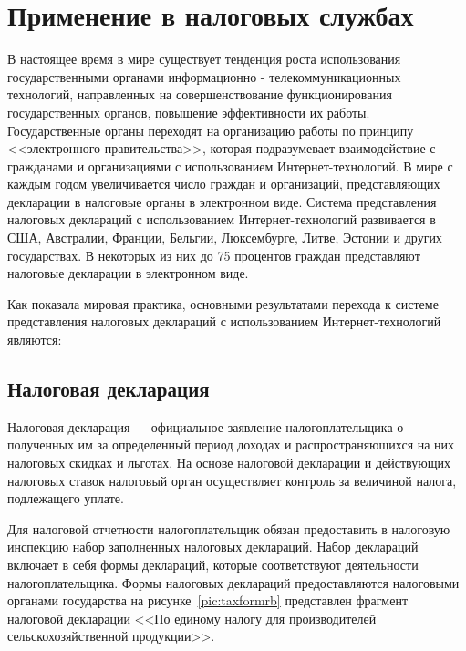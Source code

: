 \documentclass[14pt,a4paper]{reportmod}
\begin{document}
\section{Применение в налоговых службах}
В настоящее время в мире существует тенденция роста использования государственными органами информационно - телекоммуникационных технологий, направленных на совершенствование функционирования государственных органов, повышение эффективности их работы. Государственные органы переходят на организацию работы по принципу <<электронного правительства>>, которая подразумевает взаимодействие с гражданами и организациями с использованием Интернет-технологий. В мире с каждым годом увеличивается число граждан и организаций, представляющих декларации в налоговые органы в электронном виде. Система представления налоговых деклараций с использованием Интернет-технологий развивается в США, Австралии, Франции, Бельгии, Люксембурге, Литве, Эстонии и других государствах. В некоторых из них до 75 процентов граждан представляют налоговые декларации в электронном виде.

Как показала мировая практика, основными результатами перехода к системе представления налоговых деклараций с использованием Интернет-технологий являются:
\begin{gostitemize}
\end{gostitemize}

\subsection{Налоговая декларация}
Налоговая декларация — официальное заявление налогоплательщика о полученных им за определенный период доходах и распространяющихся на них налоговых скидках и льготах. На основе налоговой декларации и действующих налоговых ставок налоговый орган осуществляет контроль за величиной налога, подлежащего уплате\cite{refwikitaxreturn}.

Для налоговой отчетности налогоплательщик обязан предоставить в налоговую инспекцию набор заполненных налоговых деклараций. Набор деклараций включает в себя формы деклараций, которые соответствуют деятельности налогоплательщика. Формы налоговых деклараций предоставляются налоговыми органами государства на рисунке~\ref{pic:taxformrb} представлен фрагмент налоговой декларации <<По единому налогу для производителей сельскохозяйственной продукции>>.
\end{document}

